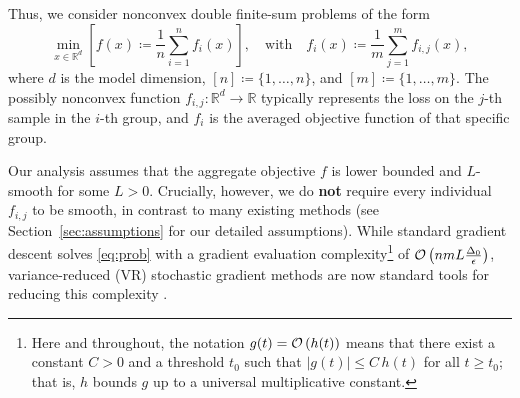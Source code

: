 \documentclass{article}
\newcommand{\bb}{\mathbb}
\newcommand{\R}{\bb R}
\newcommand{\cO}{{\cal O}}
\newcommand{\rb}[1]{\left(#1\right)}
\theoremstyle{plain}
\begin{document}
Thus, we consider nonconvex double finite-sum problems of the form
\begin{equation}\label{eq:prob}
\min \limits_{x\in \R^d}  \left[f(x) \coloneqq \frac{1}{n}\sum \limits_{i=1}^n{f_i(x)} \right],\quad \text{with} \quad f_i(x) \coloneqq \frac{1}{m}\sum_{j=1}^m{f_{i,j}(x)} ,
\end{equation}
where $d$ is the model dimension, $[n]\coloneqq\{1,\ldots,n\}$, and $[m]\coloneqq\{1,\ldots,m\}$. The possibly nonconvex function $f_{i,j}:\R^d\to\R$ typically represents the loss on the $j$-th sample in the $i$-th group, and $f_i$ is the averaged objective function of that specific group.

Our analysis assumes that the aggregate objective $f$ is lower bounded and $L$-smooth for some $L>0$. Crucially, however, we do \textbf{not} require every individual $f_{i,j}$ to be smooth, in contrast to many existing methods (see Section~\ref{sec:assumptions} for our detailed assumptions). While standard gradient descent solves \eqref{eq:prob} with a gradient evaluation complexity\footnote{Here and throughout, the notation $g(t)=\cO\rb{h(t)}$ means that there exist a constant $C>0$ and a threshold $t_0$ such that $|g(t)|\le C\,h(t)$ for all $t\ge t_0$; that is, $h$ bounds $g$ up to a universal multiplicative constant.} of $\cO\rb{nm L \frac{\Delta_0}{\epsilon}}$, variance-reduced (VR) stochastic gradient methods are now standard tools for reducing this complexity \citep{johnson2013accelerating, fang2018spider, li21, sadiev2025improved, sokolov2025bernoulli, sokolov2022non}.
\end{document}
